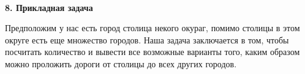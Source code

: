 \documentclass{article}
\begin{document}
\vspace{5mm}
\\
\noindent
\textbf{8. Прикладная задача} 
\begin{flushleft}
	Предположим у нас есть город столица некого окураг, помимо столицы в этом округе есть еще множество городов. Наша задача заключается в том, чтобы посчитать количество и вывести все возможные варианты того, каким образом можно проложить дороги от столицы до всех других городов.
\end{flushleft}
\end{document}
